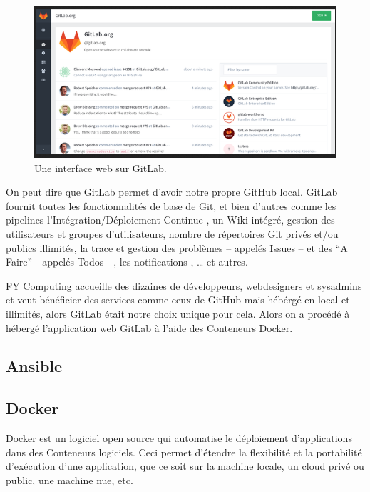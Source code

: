 \begin{figure}[H]
    \centering
    \includegraphics{images/exemple-gitlab.png}
    \caption{Une interface web sur GitLab.}
    \label{fig:exemple}
\end{figure}

On peut dire que GitLab permet d’avoir notre propre GitHub local. GitLab fournit toutes les fonctionnalités de base de Git, et bien d’autres comme les pipelines l’Intégration/Déploiement Continue , un Wiki intégré, gestion des utilisateurs et groupes d’utilisateurs, nombre de répertoires Git privés et/ou publics illimités, la trace et gestion des problèmes – appelés Issues – et des “A Faire” - appelés Todos - , les notifications , … et autres.
\newline

FY Computing accueille des dizaines de développeurs, webdesigners et sysadmins et veut bénéficier des services comme ceux de GitHub mais hébérgé en local et illimités, alors GitLab était notre choix unique pour cela. Alors on a procédé à hébergé l’application web GitLab à l’aide des Conteneurs Docker.

\newpage

\subsection{Ansible} \label{ansible}

\newpage

\subsection{Docker} \label{docker}
Docker est un logiciel open source qui automatise le déploiement d'applications dans des Conteneurs logiciels. Ceci permet d'étendre la flexibilité et la portabilité d’exécution d'une application, que ce soit sur la machine locale, un cloud privé ou public, une machine nue, etc. 
\newline

